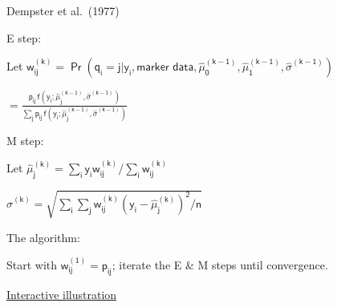 \documentclass[12pt]{article}
\newcommand{\headsize}{\fontsize{35}{35} \selectfont}
\newcommand{\smallsize}{\fontsize{25}{30} \selectfont}
\begin{document}
\hfill
\begin{minipage}{10in}
\color{mywhite} \smallsize
 Dempster et al.\ (1977)
\vspace{5mm}

 {\color{mypink} E step}:
\vspace{5mm}

\hspace{10mm} Let \hspace{5mm} $\mathsf{w_{ij}^{(k)} = \Pr(q_i = j | y_i,\text{marker
data},\hat{\mu}_0^{(k-1)}, \hat{\mu}_1^{(k-1)},\hat{\sigma}^{(k-1)})}$
\vspace{5mm}

\hspace{56mm} $\mathsf{ = \frac{p_{ij} \,
f(y_i; \hat{\mu}_j^{(k-1)},\hat{\sigma}^{(k-1)})}{
\sum_j p_{ij} \, f(y_i; \hat{\mu}_j^{(k-1)},\hat{\sigma}^{(k-1)})}}$
\vspace{5mm}

 {\color{mypink} M step}:
\vspace{5mm}

\hspace{10mm} Let \hspace{5mm} $\mathsf{\hat{\mu}_j^{(k)} = \sum_i y_i w_{ij}^{(k)} / \sum_i
w_{ij}^{(k)}}$
\vspace{5mm}

\hspace{31.5mm} $\mathsf{\hat{\sigma}^{(k)} = \sqrt{ \sum_i \sum_j w_{ij}^{(k)}
(y_i-\hat{\mu}_j^{(k)})^2/n}}$
\vspace{5mm}

 {\color{mypink} The algorithm}:
\vspace{5mm}

\hspace{10mm} Start with $\mathsf{w_{ij}^{(1)} = p_{ij}}$; iterate the E \& M steps until
convergence.
\end{minipage}

\newpage

\headsize \color{myyellow}
\hfill \begin{minipage}{5.75in}
\centering
\href{http://www.biostat.wisc.edu/~kbroman/D3/em_alg/}{Interactive illustration}
\end{minipage}

\vfill
\end{document}
